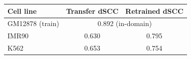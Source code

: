 \renewcommand{\arraystretch}{1.2}
\begin{tabular}{@{}lcc@{}}
\toprule
\textbf{Cell line} & \textbf{Transfer dSCC} & \textbf{Retrained dSCC} \\
\midrule
GM12878 (train) & \multicolumn{2}{c}{0.892 (in-domain)} \\
IMR90 & 0.630 & 0.795 \\
K562 & 0.653 & 0.754 \\
\bottomrule
\end{tabular}
